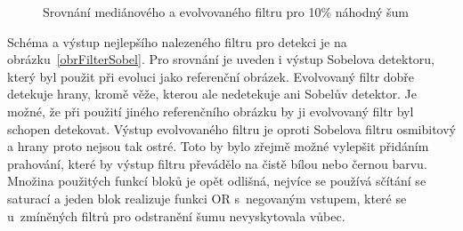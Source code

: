 \begin{figure}[htb]
    \centering
    \hfill
    \hfill
    \caption{Srovnání mediánového a evolvovaného filtru pro 10\% náhodný šum}
    \label{obrFilterImp}
\end{figure}

Schéma a výstup nejlepšího nalezeného filtru pro detekci je na obrázku~\ref{obrFilterSobel}. Pro srovnání je uveden i výstup Sobelova detektoru, který byl použit při evoluci jako referenční obrázek. Evolvovaný filtr dobře detekuje hrany, kromě věže, kterou ale nedetekuje ani Sobelův detektor. Je možné, že při použití jiného referenčního obrázku by ji evolvovaný filtr byl schopen detekovat. Výstup evolvovaného filtru je oproti Sobelova filtru osmibitový a hrany proto nejsou tak ostré. Toto by bylo zřejmě možné vylepšit přidáním prahování, které by výstup filtru převádělo na čistě bílou nebo černou barvu. Množina použitých funkcí bloků je opět odlišná, nejvíce se používá sčítání se saturací a jeden blok realizuje funkci OR s~negovaným vstupem, které se u~zmíněných filtrů pro odstranění šumu nevyskytovala vůbec.


